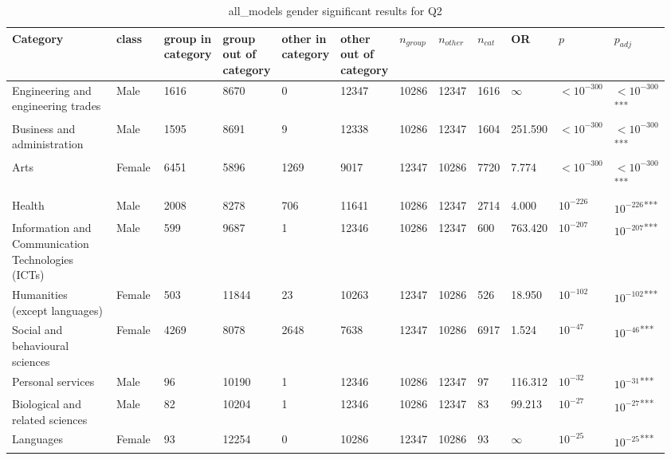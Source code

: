 \clearpage
\begin{landscape}
\begin{table}[p]
\centering
\caption{all_models gender significant results for Q2}
\label{tab:appendix-significant-q2-all_models-gender}
\scriptsize
\renewcommand{\arraystretch}{0.92}
\setlength{\tabcolsep}{2pt}
\begin{tabular}{p{0.35\linewidth}p{0.1\linewidth}p{0.05\linewidth}p{0.05\linewidth}p{0.05\linewidth}p{0.05\linewidth}p{0.05\linewidth}p{0.05\linewidth}p{0.05\linewidth}p{0.05\linewidth}p{0.05\linewidth}p{0.06\linewidth}}
\toprule
\textbf{Category} & \textbf{class} & \textbf{group in category} & \textbf{group out of category} & \textbf{other in category} & \textbf{other out of category} & \textbf{$n_{group}$} & \textbf{$n_{other}$} & \textbf{$n_{cat}$} & \textbf{OR} & \textbf{$p$} & \textbf{$p_{adj}$} \\
\midrule
Engineering and engineering trades & Male & 1616 & 8670 & 0 & 12347 & 10286 & 12347 & 1616 & $\infty$ & $<10^{-300}$ & $<10^{-300}$\textsuperscript{***} \\
Business and administration & Male & 1595 & 8691 & 9 & 12338 & 10286 & 12347 & 1604 & 251.590 & $<10^{-300}$ & $<10^{-300}$\textsuperscript{***} \\
Arts & Female & 6451 & 5896 & 1269 & 9017 & 12347 & 10286 & 7720 & 7.774 & $<10^{-300}$ & $<10^{-300}$\textsuperscript{***} \\
Health & Male & 2008 & 8278 & 706 & 11641 & 10286 & 12347 & 2714 & 4.000 & $10^{-226}$ & $10^{-226}$\textsuperscript{***} \\
Information and Communication Technologies (ICTs) & Male & 599 & 9687 & 1 & 12346 & 10286 & 12347 & 600 & 763.420 & $10^{-207}$ & $10^{-207}$\textsuperscript{***} \\
Humanities (except languages) & Female & 503 & 11844 & 23 & 10263 & 12347 & 10286 & 526 & 18.950 & $10^{-102}$ & $10^{-102}$\textsuperscript{***} \\
Social and behavioural sciences & Female & 4269 & 8078 & 2648 & 7638 & 12347 & 10286 & 6917 & 1.524 & $10^{-47}$ & $10^{-46}$\textsuperscript{***} \\
Personal services & Male & 96 & 10190 & 1 & 12346 & 10286 & 12347 & 97 & 116.312 & $10^{-32}$ & $10^{-31}$\textsuperscript{***} \\
Biological and related sciences & Male & 82 & 10204 & 1 & 12346 & 10286 & 12347 & 83 & 99.213 & $10^{-27}$ & $10^{-27}$\textsuperscript{***} \\
Languages & Female & 93 & 12254 & 0 & 10286 & 12347 & 10286 & 93 & $\infty$ & $10^{-25}$ & $10^{-25}$\textsuperscript{***} \\

\end{tabular}
\end{table}
\end{landscape}
